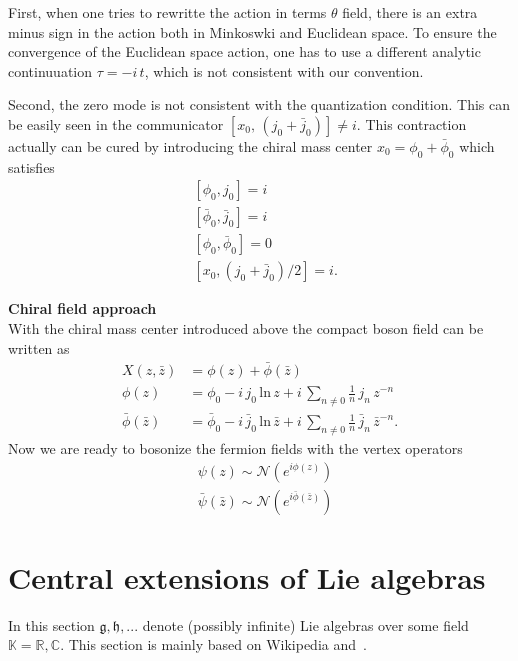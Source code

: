 \documentclass[submission, PhysLectNotes]{SciPost}
\begin{document}
First, when one tries to rewritte the action in terms $\theta$ field, there is an extra minus sign in the action both in Minkoswki and Euclidean space. To ensure the convergence of the Euclidean space action, one has to use a different analytic continuuation $\tau = -i\,t$, which is not consistent with our convention.

Second, the zero mode is not consistent with the quantization condition. This can be easily seen in the communicator $\left[x_0,\,\left(j_0+\bar{j}_0\right)\right] \neq i$. This contraction actually can be cured by introducing the chiral mass center $x_0 = \phi_0 + \bar{\phi}_0$ which satisfies
\begin{equation}
	\begin{split}
		&\left[\phi_0,j_0\right] = i\\
		&\left[\bar{\phi}_0,\bar{j}_0\right] = i\\
		&\left[\phi_0,\bar{\phi}_0\right] = 0 \\
		&\left[x_0,\left(j_0+\bar{j}_0\right)/2\right] = i.
	\end{split}
\end{equation}

{\bf Chiral field approach}\\
With the chiral mass center introduced above the compact boson field can be written as 
\begin{equation}
	\begin{split}
		X(z,\bar{z}) &= \phi(z) + \bar{\phi}(\bar{z}) \\
		\phi(z) &= \phi_0 -i\,j_0\,\mathrm{ln}\,z + i\,\sum_{n\neq0} \frac{1}{n}\,j_n\,z^{-n} \\
		\bar{\phi}(\bar{z}) &= \bar{\phi}_0 -i\,\bar{j}_0\,\mathrm{ln}\,\bar{z} + i\,\sum_{n\neq0} \frac{1}{n}\,\bar{j}_n\,\bar{z}^{-n}.
	\end{split}
\end{equation} 
Now we are ready to bosonize the fermion fields with the vertex operators
\begin{equation}
	\begin{split}
		&\psi(z) \sim \mathcal{N}\left(e^{i\phi(z)}\right) \\
		&\bar{\psi}(\bar{z}) \sim \mathcal{N}\left(e^{i\bar{\phi}(\bar{z})}\right)
	\end{split}
\end{equation}

\appendix

\section{Central extensions of Lie algebras}
In this section $\mathfrak{g},\mathfrak{h},...$ denote (possibly infinite) Lie algebras over some field $\mathbb{K} = \mathbb{R}, \mathbb{C}$. This section is mainly based on Wikipedia and~\cite{Schottenloher}.
\end{document}
